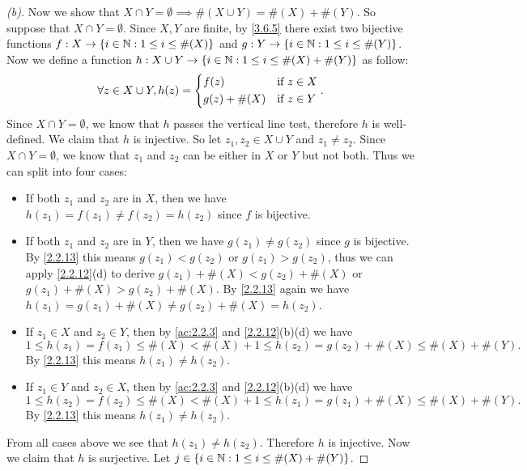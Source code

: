 \begin{proof}[(b)]
	Now we show that \(X \cap Y = \emptyset \implies \#(X \cup Y) = \#(X) + \#(Y)\).
	So suppose that \(X \cap Y = \emptyset\).
	Since \(X, Y\) are finite, by \cref{3.6.5} there exist two bijective functions \(f : X \to \left\lbrace i \in \mathbb{N} : 1 \leq i \leq \#(X)\right\rbrace\) and \(g : Y \to \left\lbrace i \in \mathbb{N} : 1 \leq i \leq \#(Y)\right\rbrace\).
	Now we define a function \(h : X \cup Y \to \left\lbrace i \in \mathbb{N} : 1 \leq i \leq \#(X) + \#(Y)\right\rbrace\) as follow:
	\[
		\forall z \in X \cup Y, h(z) = \begin{dcases}
			f(z)         & \text{if } z \in X \\
			g(z) + \#(X) & \text{if } z \in Y
		\end{dcases}.
	\]
	Since \(X \cap Y = \emptyset\), we know that \(h\) passes the vertical line test, therefore \(h\) is well-defined.
	We claim that \(h\) is injective.
	So let \(z_1, z_2 \in X \cup Y\) and \(z_1 \neq z_2\).
	Since \(X \cap Y = \emptyset\), we know that \(z_1\) and \(z_2\) can be either in \(X\) or \(Y\) but not both.
	Thus we can split into four cases:
	\begin{itemize}
		\item If both \(z_1\) and \(z_2\) are in \(X\), then we have \(h(z_1) = f(z_1) \neq f(z_2) = h(z_2)\) since \(f\) is bijective.
		\item If both \(z_1\) and \(z_2\) are in \(Y\), then we have \(g(z_1) \neq g(z_2)\) since \(g\) is bijective.
		      By \cref{2.2.13} this means \(g(z_1) < g(z_2)\) or \(g(z_1) > g(z_2)\), thus we can apply \cref{2.2.12}(d) to derive \(g(z_1) + \#(X) < g(z_2) + \#(X)\) or \(g(z_1) + \#(X) > g(z_2) + \#(X)\).
		      By \cref{2.2.13} again we have \(h(z_1) = g(z_1) + \#(X) \neq g(z_2) + \#(X) = h(z_2)\).
		\item If \(z_1 \in X\) and \(z_2 \in Y\), then by \cref{ac:2.2.3} and \cref{2.2.12}(b)(d) we have
		      \[
			      1 \leq h(z_1) = f(z_1) \leq \#(X) < \#(X) + 1 \leq h(z_2) = g(z_2) + \#(X) \leq \#(X) + \#(Y).
		      \]
		      By \cref{2.2.13} this means \(h(z_1) \neq h(z_2)\).
		\item If \(z_1 \in Y\) and \(z_2 \in X\), then by \cref{ac:2.2.3} and \cref{2.2.12}(b)(d) we have
		      \[
			      1 \leq h(z_2) = f(z_2) \leq \#(X) < \#(X) + 1 \leq h(z_1) = g(z_1) + \#(X) \leq \#(X) + \#(Y).
		      \]
		      By \cref{2.2.13} this means \(h(z_1) \neq h(z_2)\).
	\end{itemize}
	From all cases above we see that \(h(z_1) \neq h(z_2)\).
	Therefore \(h\) is injective.
	Now we claim that \(h\) is surjective.
	Let \(j \in \left\lbrace i \in \mathbb{N} : 1 \leq i \leq \#(X) + \#(Y)\right\rbrace\).

\end{proof}
